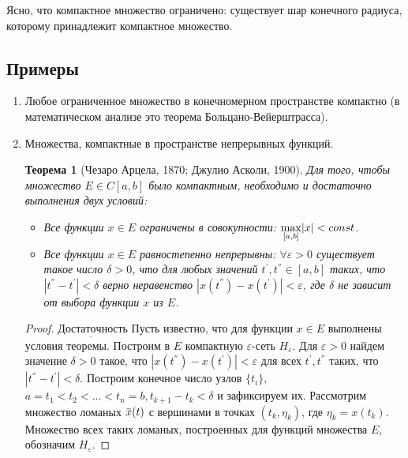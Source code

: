 \documentclass[12pt,a4paper,titlepage, oneside]{book}
\newcommand{\overbar}[1]{\mkern 1.5mu\overline{\mkern-1.5mu#1\mkern-1.5mu}\mkern 1.5mu}
\theoremstyle{definition}
\theoremstyle{plain}
\newtheorem*{theorem}{Теорема}
\theoremstyle{remark}
\theoremstyle{remark}
\theoremstyle{remark}
\theoremstyle{plain}
\theoremstyle{plain}
\begin{document}
Ясно, что компактное множество ограничено: существует шар конечного радиуса, которому принадлежит компактное множество.

\subsection*{Примеры}
\begin{enumerate}

	\item Любое ограниченное множество в конечномерном пространстве компактно (в математическом анализе это теорема Больцано-Вейерштрасса).

	\item Множества, компактные в пространстве непрерывных функций.

\begin{theorem} [Чезаро Арцела, 1870; Джулио Асколи, 1900]
Для того, чтобы множество $E \in C[a, b]$ было компактным, необходимо и достаточно выполнения двух условий:

\begin{itemize}

	\item  Все функции $x\in E$ ограничены в совокупности: $\smash{\displaystyle\max_{ [a,b]}} |x| < const$.

	\item  Все функции $x\in E$ равностепенно непрерывны: $\forall \varepsilon>0$ существует такое число $\delta>0$, что для любых значений $t^{'}, t^{''} \in [a, b]$ таких, что $|t^{''}-t^{'}| <\delta$ верно неравенство $|x(t^{''})-x(t^{'})| <\varepsilon$, где $\delta$ не зависит от выбора функции $x$ из $E$.
	
\end{itemize}

\end{theorem}
\begin{proof} 
	$\underbar{Достаточность}$ Пусть известно, что для функции $x\in E$ выполнены условия теоремы. Построим в $E$ компактную 	$\varepsilon$-сеть $H_{\varepsilon}$. Для 	$ \varepsilon>0$ найдем значение $\delta>0$ такое, что $|x(t^{''})-x(t^{'})| <\varepsilon$ для всех $t^{'}, t^{''}$ таких, что $|t^{''}-t^{'}| <\delta$. Построим конечное число узлов $\{t_i\}$, $a=t_1<t_2<...<t_n=b, t_{k+1}-t_k< \delta$ и зафиксируем их. Рассмотрим множество ломаных $\overbar{x}(t)$ с вершинами в точках $(t_k, \eta_k )$, где $\eta_k=x(t_k)$. Множество всех таких ломаных, построенных для функций множества $E$, обозначим $H_{\varepsilon}$.
	

\end{proof}
\end{enumerate}
\end{document}
